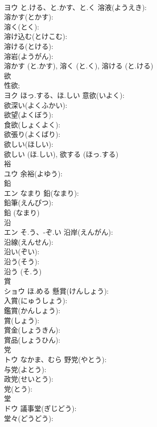 \documentclass[8pt]{extreport}
\begin{document}
\begin{CJK}{UTF8}{min}
\\	ヨウ	と.ける、と.かす、と.く	溶液(ようえき): 
\\	溶かす(とかす): 
\\	溶く(とく): 
\\	溶け込む(とけこむ): 
\\	溶ける(とける): 
\\	溶岩(ようがん): 
\\	溶かす (と.かす), 溶く (と.く), 溶ける (と.ける)
\\	欲			
\\	性欲; 
\\	ヨク	ほっ.する、ほ.しい	意欲(いよく): 
\\	欲深い(よくふかい): 
\\	欲望(よくぼう): 
\\	食欲(しょくよく): 
\\	欲張り(よくばり): 
\\	欲しい(ほしい): 
\\	欲しい (ほ.しい), 欲する (ほっ.する)
\\	裕			
\\	ユウ		余裕(よゆう): 
\\	鉛			
\\	エン	なまり	鉛(なまり): 
\\	鉛筆(えんぴつ): 
\\	鉛 (なまり)
\\	沿			
\\	エン	そ.う、-ぞ.い	沿岸(えんがん): 
\\	沿線(えんせん): 
\\	沿い(ぞい): 
\\	沿う(そう): 
\\	沿う (そ.う)
\\	賞			
\\	ショウ	ほ.める	懸賞(けんしょう): 
\\	入賞(にゅうしょう): 
\\	鑑賞(かんしょう): 
\\	賞(しょう): 
\\	賞金(しょうきん): 
\\	賞品(しょうひん): 
\\	党			
\\	トウ	なかま、むら	野党(やとう): 
\\	与党(よとう): 
\\	政党(せいとう): 
\\	党(とう): 
\\	堂			
\\	ドウ		議事堂(ぎじどう): 
\\	堂々(どうどう): 

\end{CJK}
\end{document}
